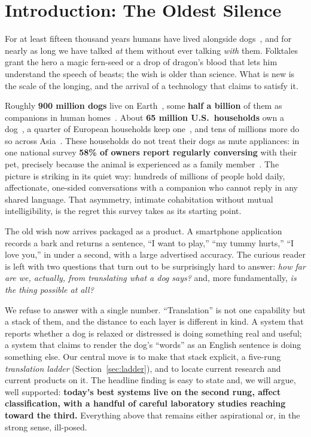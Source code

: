 \section{Introduction: The Oldest Silence}
\label{sec:intro}

For at least fifteen thousand years humans have lived alongside
dogs~\cite{frantz2016genomic}, and for nearly as long we have talked
\emph{at} them without ever talking \emph{with} them. Folktales grant the
hero a magic fern-seed or a drop of dragon's blood that lets him understand
the speech of beasts; the wish is older than science. What is new is the
scale of the longing, and the arrival of a technology that claims to
satisfy it.

Roughly \textbf{900 million dogs} live on Earth~\cite{dogster2026stats},
some \textbf{half a billion} of them as companions in human
homes~\cite{sustainablediets2025}. About \textbf{65 million U.S.\
households} own a dog~\cite{avma2025,dogster2026stats}, a quarter of
European households keep one~\cite{fediaf2025}, and tens of millions more
do so across Asia~\cite{worldanimalfoundation2026}. These households do not
treat their dogs as mute appliances: in one national survey \textbf{58\% of
owners report regularly conversing} with their pet, precisely because the
animal is experienced as a family member~\cite{budgetdirect2024}. The
picture is striking in its quiet way: hundreds of millions of people hold
daily, affectionate, one-sided conversations with a companion who cannot
reply in any shared language. That asymmetry, intimate cohabitation without
mutual intelligibility, is the regret this survey takes as its starting
point.

The old wish now arrives packaged as a product. A smartphone application
records a bark and returns a sentence, ``I want to play,'' ``my tummy
hurts,'' ``I love you,'' in under a second, with a large advertised
accuracy. The curious reader is left with two questions that turn out to be
surprisingly hard to answer: \emph{how far are we, actually, from
translating what a dog says?} and, more fundamentally, \emph{is the thing
possible at all?}

We refuse to answer with a single number. ``Translation'' is not one
capability but a stack of them, and the distance to each layer is different
in kind. A system that reports whether a dog is relaxed or distressed is
doing something real and useful; a system that claims to render the dog's
``words'' as an English sentence is doing something else. Our central move
is to make that stack explicit, a five-rung \emph{translation ladder}
(Section~\ref{sec:ladder}), and to locate current research and current
products on it. The headline finding is easy to state and, we will argue,
well supported: \textbf{today's best systems live on the second rung,
affect classification, with a handful of careful laboratory studies
reaching toward the third.} Everything above that remains either
aspirational or, in the strong sense, ill-posed.

